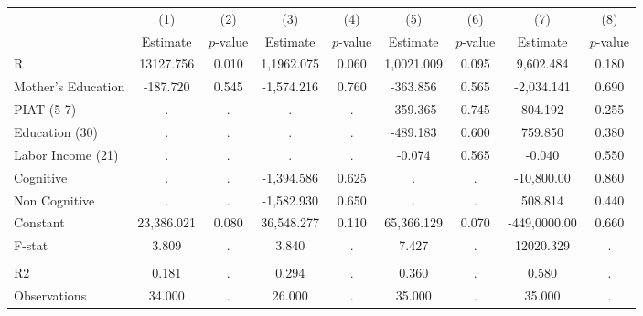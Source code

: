 \begin{tabular}{lcccccccc} \toprule
 & (1) & (2) & (3) & (4) & (5) & (6) & (7) & (8) \\ 
 & Estimate  & $p$-value  & Estimate  & $p$-value  & Estimate  & $p$-value  & Estimate  & $p$-value  \\  \midrule
R & 13127.756 &     0.010 & 1,1962.075 &     0.060 & 1,0021.009 &     0.095 &  9,602.484 &     0.180 \\  
Mother's Education &  -187.720 &     0.545 & -1,574.216 &     0.760 &  -363.856 &     0.565 & -2,034.141 &     0.690 \\  
PIAT (5-7) &         . &         . &         . &         . &  -359.365 &     0.745 &   804.192 &     0.255 \\  
Education (30) &         . &         . &         . &         . &  -489.183 &     0.600 &   759.850 &     0.380 \\  
Labor Income (21) &         . &         . &         . &         . &    -0.074 &     0.565 &    -0.040 &     0.550 \\  
Cognitive &         . &         . & -1,394.586 &     0.625 &         . &         . & -10,800.00 &     0.860 \\  
Non Cognitive &         . &         . & -1,582.930 &     0.650 &         . &         . &   508.814 &     0.440 \\  
Constant & 23,386.021 &     0.080 & 36,548.277 &     0.110 & 65,366.129 &     0.070 & -449,0000.00 &     0.660 \\  
F-stat &     3.809 &         . &     3.840 &         . &     7.427 &         . & 12020.329 &         . \\  \\ \midrule
R2 &     0.181 &         . &     0.294 &         . &     0.360 &         . &     0.580 &         . \\  
Observations &    34.000 &         . &    26.000 &         . &    35.000 &         . &    35.000 &         . \\  
\bottomrule \end{tabular}
